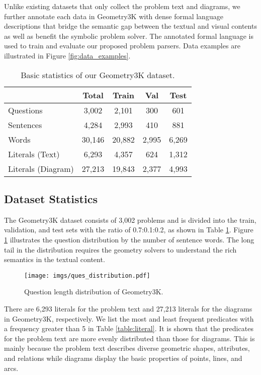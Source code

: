 \documentclass[11pt,a4paper]{article}
\begin{document}
Unlike existing datasets that only collect the problem text and diagrams, we further annotate each data in Geometry3K with dense formal language descriptions that bridge the semantic gap between the textual and visual contents as well as benefit the symbolic problem solver. The annotated formal language is used to train and evaluate our proposed problem parsers. Data examples are illustrated in Figure \ref{fig:data_examples}.





\begin{table}[t]
\centering 
\small 
\begin{tabular}{l|cccc}
	\hline
	 & Total & Train & Val & Test  \\
	\hline
	Questions & 3,002 & 2,101 & 300 & 601 \\
	Sentences & 4,284 & 2,993 & 410 & 881 \\
	Words  & 30,146 & 20,882 & 2,995 & 6,269 \\
	\hline
	Literals (Text) & 6,293 & 4,357 & 624 & 1,312 \\
	Literals (Diagram) & 27,213 & 19,843 & 2,377 & 4,993 \\
	\hline
\end{tabular}
\caption{Basic statistics of our Geometry3K dataset.}
\label{table:data_stats}
\end{table}



\subsection{Dataset Statistics}

The Geometry3K dataset consists of 3,002 problems and is divided into the train, validation, and test sets with the ratio of 0.7:0.1:0.2, as shown in Table \ref{table:data_stats}. Figure \ref{fig2:ques_dist} illustrates the question distribution by the number of sentence words. The long tail in the distribution requires the geometry solvers to understand the rich semantics in the textual content.

\begin{figure}[th]
    \centering 
    \texttt{[image: imgs/ques\_distribution.pdf]}
\caption{Question length distribution of Geometry3K.}
\label{fig2:ques_dist}
\end{figure}


There are 6,293 literals for the problem text and 27,213 literals for the diagrams in Geometry3K, respectively. We list the most and least frequent predicates with a frequency greater than 5 in Table \ref{table:literal}. It is shown that the predicates for the problem text are more evenly distributed than those for diagrams. This is mainly because the problem text describes diverse geometric shapes, attributes, and relations while diagrams display the basic properties of points, lines, and arcs.
\end{document}
